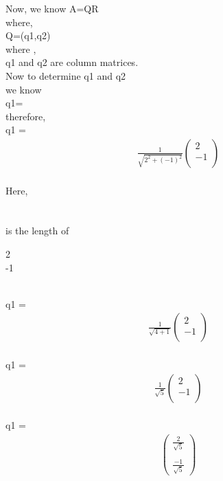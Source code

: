 \documentclass[a4paper,12pt]{article}
\begin{document}
		Now, we know A=QR\\
		where,\\
		Q=(q1,q2)
		\\
		where ,\\
		q1 and q2 are column matrices.\\
		Now to determine q1 and q2\\
		we know\\
		
		q1=\\
		
		therefore,\\
		
	q1 =\begin{gather}
	    \frac{1}{\sqrt{2^2+(-1)^2}}
	\begin{pmatrix}
		 2\\
		 -1\\
	\end{pmatrix}
		\end{gather}\\
		Here,\\
		 \\
		
		\\
		
		is the length of \begin{pmatrix}
		 2\\
		 -1\\
	\end{pmatrix}\\

	
		q1 = \begin{gather}
	    \frac{1}{\sqrt{4+1}}
	\begin{pmatrix}
		 2\\
		 -1\\
	\end{pmatrix}
	\end{gather}
	\\
	q1 = \begin{gather}
	    \frac{1}{\sqrt{5}}
	\begin{pmatrix}
		 2\\
		 -1\\
	\end{pmatrix}
		\end{gather}\\
	
		q1 = \begin{gather}
	\begin{pmatrix}
		   \frac{2}{\sqrt{5}}\\
		   \\
		     \frac{-1}{\sqrt{5}}
	\end{pmatrix}
		\end{gather}\\
	
\end{document}

